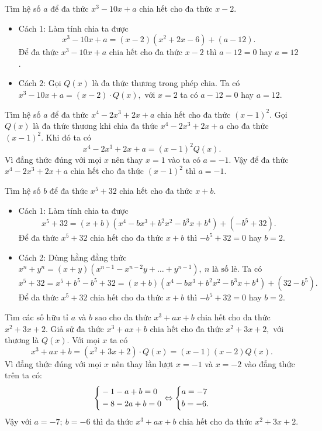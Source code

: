 \begin{vn} %
	Tìm hệ số $a$ để đa thức $x^3-10x+a$ chia hết cho đa thức $x-2$.
	\loigiai
	{
	\begin{itemize}
		\item Cách 1: Làm tính chia ta được \[x^3-10x+a=(x-2)(x^2+2x-6)+(a-12).\]
		Để đa thức $x^3-10x+a$ chia hết cho đa thức $x-2$ thì $a-12=0$ hay $a=12$.
		\item  Cách 2:  Gọi $Q(x)$ là đa thức thương trong phép chia. Ta có $x^3-10x+a=(x-2)\cdot Q(x),$ với $x=2$ ta có $a-12=0$ hay $a=12$.
	\end{itemize}	
	}
\end{vn}\begin{vn} %
Tìm hệ số $a$ để đa thức $x^4-2x^3+2x+a$ chia hết cho đa thức $(x-1)^2$.
\loigiai
{
	Gọi $Q(x)$ là đa thức thương khi chia đa thức $x^4-2x^3+2x+a$ cho đa thức $(x-1)^2$. Khi đó ta có \[x^4-2x^3+2x+a=(x-1)^2Q(x).\] Vì đẳng thức đúng với mọi $x$ nên thay $x=1$ vào ta có $a=-1.$
	Vậy để đa thức $x^4-2x^3+2x+a$ chia hết cho đa thức $(x-1)^2$ thì $a=-1$.
}
\end{vn}
\begin{vn} %
	Tìm hệ số $b$ để đa thức $x^5+32$ chia hết cho đa thức $x+b$.
	\loigiai
	{
		\begin{itemize}
			\item  Cách 1: Làm tính chia ta được \[x^5+32=(x+b)(x^4-bx^3+b^2x^2-b^3x+b^4)+(-b^5+32).\]
			Để đa thức $x^5+32$ chia hết cho đa thức $x+b$ thì $-b^5+32=0$ hay $b=2$.
			\item Cách 2: Dùng hằng đẳng thức $x^n+y^n=(x+y)(x^{n-1}-x^{n-2}y+\ldots+y^{n-1}),\ n\mbox{ là số lẻ}.$ Ta có\\
			\[x^5+32=x^5+b^5-b^5+32=(x+b)(x^4-bx^3+b^2x^2-b^3x+b^4)+(32-b^5).\]
			Để đa thức $x^5+32$ chia hết cho đa thức $x+b$ thì $-b^5+32=0$ hay $b=2$.
			\end{itemize}
			}
	\end{vn}
		\begin{vn}  %
			Tìm các số hữu tỉ $a$ và $b$ sao cho đa thức $x^3+ax+b$ chia hết cho đa thức $x^2+3x+2.$
			\loigiai
			{
		Giả sử	đa thức $x^3+ax+b$ chia hết cho đa thức $x^2+3x+2,$ với thương là $Q(x).$ Với mọi $x$ ta có 
		\[x^3+ax+b=(x^2+3x+2)\cdot Q(x)=(x-1)(x-2)Q(x).\]
		Vì đẳng thức đúng với mọi $x$ nên thay lần lượt $x=-1$ và $x=-2$ vào đẳng thức trên ta có:
		\[\left\{\begin{aligned}&-1-a+b=0\\&-8-2a+b=0\end{aligned}\right.\Leftrightarrow\left\{\begin{aligned}&a=-7\\&b=-6.\end{aligned}\right.\]
		Vậy với $a=-7;\ b=-6$ thì đa thức $x^3+ax+b$ chia hết cho đa thức $x^2+3x+2.$
		}
			\end{vn}
